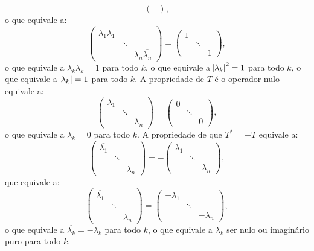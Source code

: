 \documentclass[11pt,a4paper]{article}
\begin{document}
{{\[\begin{pmatrix}
\end{pmatrix},
\]
o que equivale a:
\[
\begin{pmatrix}
\lambda_1\overline{\lambda_1}&&\\&\ddots&\\&&\lambda_n\overline{\lambda_n}
\end{pmatrix}=\begin{pmatrix}
1&&\\&\ddots&\\&&1
\end{pmatrix},
\]
o que equivale a $\lambda_k\overline{\lambda_k}=1$ para todo $k$, o que equivale a $\abs{\lambda_k}^2=1$ para todo $k$, o que equivale a $\abs{\lambda_k}=1$ para todo $k$.
\task[\pers{c}] A propriedade de $T$ é o operador nulo equivale a:
\[
\begin{pmatrix}
\lambda_1&&\\&\ddots&\\&&\lambda_n
\end{pmatrix}=\begin{pmatrix}
0&&\\&\ddots&\\&&0
\end{pmatrix},
\]
o que equivale a $\lambda_k=0$ para todo $k$.
\task[\pers{d}] A propriedade de que $T^*=-T$ equivale a:
\[
\begin{pmatrix}
\overline{\lambda_1}&&\\&\ddots&\\&&\overline{\lambda_n}
\end{pmatrix}=-\begin{pmatrix}
\lambda_1&&\\&\ddots&\\&&\lambda_n
\end{pmatrix},
\]
que equivale a:
\[
\begin{pmatrix}
\overline{\lambda_1}&&\\&\ddots&\\&&\overline{\lambda_n}
\end{pmatrix}=\begin{pmatrix}
-\lambda_1&&\\&\ddots&\\&&-\lambda_n
\end{pmatrix},
\]
o que equivale a $\overline{\lambda_k}=-\lambda_k$ para todo $k$, o que equivale a $\lambda_k$ ser nulo ou imaginário puro para todo $k$.
}
}
\end{document}
